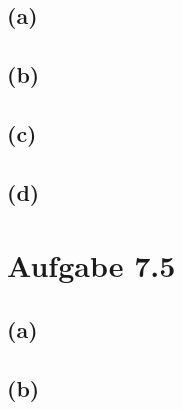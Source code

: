 \documentclass[12pt]{article}
\begin{document}
\subsection{(a)}
\subsection{(b)}
\subsection{(c)}
\subsection{(d)}


\section{Aufgabe 7.5}

\subsection{(a)}
\subsection{(b)}
\end{document}

